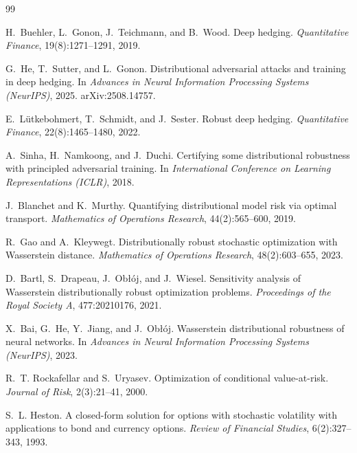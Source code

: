 \documentclass[11pt]{article}
\begin{document}
\begin{thebibliography}{99}

H.~Buehler, L.~Gonon, J.~Teichmann, and B.~Wood.
\newblock Deep hedging.
\newblock \emph{Quantitative Finance}, 19(8):1271--1291, 2019.

G.~He, T.~Sutter, and L.~Gonon.
\newblock Distributional adversarial attacks and training in deep hedging.
\newblock In \emph{Advances in Neural Information Processing Systems (NeurIPS)}, 2025.
\newblock arXiv:2508.14757.

E.~L{\"u}tkebohmert, T.~Schmidt, and J.~Sester.
\newblock Robust deep hedging.
\newblock \emph{Quantitative Finance}, 22(8):1465--1480, 2022.

A.~Sinha, H.~Namkoong, and J.~Duchi.
\newblock Certifying some distributional robustness with principled adversarial training.
\newblock In \emph{International Conference on Learning Representations (ICLR)}, 2018.

J.~Blanchet and K.~Murthy.
\newblock Quantifying distributional model risk via optimal transport.
\newblock \emph{Mathematics of Operations Research}, 44(2):565--600, 2019.

R.~Gao and A.~Kleywegt.
\newblock Distributionally robust stochastic optimization with {W}asserstein distance.
\newblock \emph{Mathematics of Operations Research}, 48(2):603--655, 2023.

D.~Bartl, S.~Drapeau, J.~Ob{\l}{\'o}j, and J.~Wiesel.
\newblock Sensitivity analysis of {W}asserstein distributionally robust optimization problems.
\newblock \emph{Proceedings of the Royal Society A}, 477:20210176, 2021.

X.~Bai, G.~He, Y.~Jiang, and J.~Ob{\l}{\'o}j.
\newblock Wasserstein distributional robustness of neural networks.
\newblock In \emph{Advances in Neural Information Processing Systems (NeurIPS)}, 2023.

R.~T. Rockafellar and S.~Uryasev.
\newblock Optimization of conditional value-at-risk.
\newblock \emph{Journal of Risk}, 2(3):21--41, 2000.

S.~L. Heston.
\newblock A closed-form solution for options with stochastic volatility with applications to bond and currency options.
\newblock \emph{Review of Financial Studies}, 6(2):327--343, 1993.

\end{thebibliography}
\end{document}
